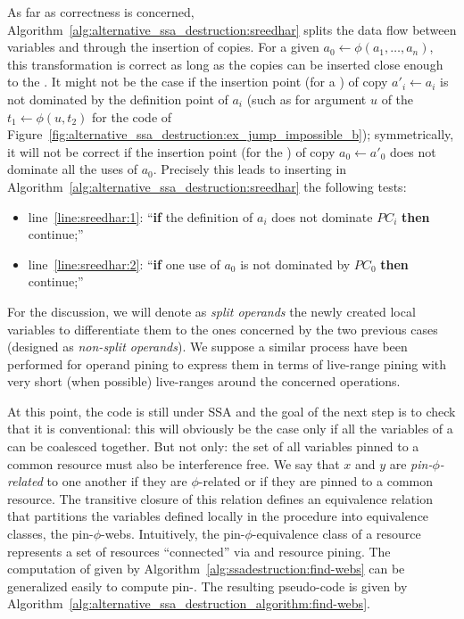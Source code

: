 As far as correctness is concerned, Algorithm~\ref{alg:alternative_ssa_destruction:sreedhar} splits the data flow between variables and \phinodes through the insertion of copies. 
For a given \phifun $a_0\gets \phi(a_1,\dots,a_n)$, this transformation is correct as long as the copies can be inserted close enough to the \phifun. 
It might not be the case if the insertion point (for a \useop) of copy $a'_i\gets a_i$ is not dominated by the definition point of $a_i$ (such as for argument $u$ of the \phifun $t_1\gets \phi(u,t_2)$ for the code of Figure~\ref{fig:alternative_ssa_destruction:ex_jump_impossible_b}); 
symmetrically, it will not be correct if the insertion point (for the ) of copy $a_0\gets a'_0$ does not dominate all the uses of $a_0$. 
Precisely this leads to inserting in Algorithm~\ref{alg:alternative_ssa_destruction:sreedhar} the following tests:
\begin{itemize}
\item line~\ref{line:sreedhar:1}: ``{\bf if} the definition of $a_i$ does not dominate $PC_i$ {\bf then} continue;''
\item line~\ref{line:sreedhar:2}: ``{\bf if} one use of $a_0$ is not dominated by $PC_0$ {\bf then} continue;''
\end{itemize}
For the discussion, we will denote as \emph{split operands} the newly created local variables to differentiate them to the ones concerned by the two previous cases (designed as \emph{non-split operands}).
We suppose a similar process have been performed for operand pining to express them in terms of live-range pining with very short (when possible) live-ranges around the concerned operations. 

At this point, the code is still under SSA and the goal of the next step is to check that it is conventional: 
this will obviously be the case only if all the variables of a \phiweb can be coalesced together. 
But not only: 
the set of all variables pinned to a common resource must also be interference free. 
We say that $x$ and $y$ are \emph{pin-$\phi$-related} to one another if they are $\phi$-related or if they are pinned to a common resource. 
The transitive closure of this relation defines an equivalence relation that partitions the variables defined locally in the procedure into equivalence classes, the pin-$\phi$-webs. 
Intuitively, the pin-$\phi$-equivalence class of a resource represents a set of resources ``connected'' via \phifuns and resource pining. 
The computation of \phiwebs given by Algorithm~\ref{alg:ssadestruction:find-webs} can be generalized easily to compute pin-\phiwebs. 
The resulting pseudo-code is given by Algorithm~\ref{alg:alternative_ssa_destruction_algorithm:find-webs}.

